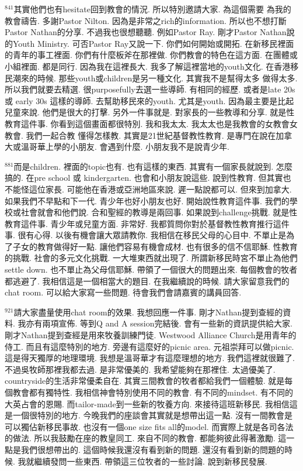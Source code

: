 \documentclass{book}
\begin{document}
$^{841}$其實他們也有hesitate回到教會的情況.
所以特別邀請大家.
為這個需要 為我的教會禱告.
多謝Pastor Nilton.
因為是非常之rich的information.
所以也不想打斷Pastor Nathan的分享.
不過我也很想聽聽.
例如Pastor Ray.
剛才Pastor Nathan說的Youth Ministry.
可否Pastor Ray又說一下.
你們如何開始或開拓.
在新移民裡面的青年的事工裡面.
你們有什麼板斧在那裡做.
你們教會的特色在這方面.
在團體或小組裡面.
都是同行.
因為我在這裡長大.
我多了解這裡當地的youth文化.
在香港移民潮來的時候.
那些youth或children是另一種文化.
其實我不是幫得太多 做得太多.
所以我們就要去精選.
很purposefully去選一些導師.
有相同的經歷.
或者是late 20s 或 early 30s 這樣的導師.
去幫助移民來的youth.
尤其是youth.
因為最主要是比起兒童來說.
他們是很大的打擊.
另外一件事就是.
對家長的一些教導和分享.
就是性教育這件事.
你看到這個畫面都很特別.
我和我太太.
我太太也是我教會的女教會女教會.
我們一起合教 懂得怎樣教.
其實是21世紀基督教性教育.
是專門在說在加拿大或溫哥華上學的小朋友.
會遇到什麼.
小朋友我不是說青少年.

$^{881}$而是children.
裡面的topic也有.
也有這樣的東西.
其實有一個家長就說到.
怎麼搞的.
在pre school 或 kindergarten.
也會和小朋友說這些.
說到性教育.
但其實也不能怪這位家長.
可能他在香港或亞洲地區來說.
遲一點說都可以.
但來到加拿大.
如果我們不早點和下一代.
青少年也好小朋友也好.
開始說性教育這件事.
我們的學校或社會就會和他們說.
合和聖經的教導是兩回事.
如果說到challenge挑戰.
就是性教育這件事.
青少年或兒童方面.
非常好.
我都質問你對於基督教性教育推行這件事.
很有心得.
以後有機會讓大眾請教你.
我相信在移民父母的心目中.
不單止是為了子女的教育做得好一點.
讓他們容易有機會成材.
也有很多的信不信耶穌.
性教育的挑戰.
社會的多元文化挑戰.
一大堆東西就出現了.
所謂新移民時宮不單止為他們settle down.
也不單止為父母信耶穌.
帶領了一個很大的問題出來.
每個教會的牧者都逃避了.
我相信這是一個相當大的題目.
在我繼續說的時候.
請大家留意我們的chat room.
可以給大家寫一些問題.
待會我們會請嘉賓的講員回答.

$^{921}$請大家盡量使用chat room的效果.
我想回應一件事.
剛才Nathan提到查經的資料.
我亦有兩項宣佈.
等到Q and A session完結後.
會有一些新的資訊提供給大家.
剛才Nathan提到查經是用來牧養訓練門徒.
Westwood Alliance Church是用青年的侍工.
而且有這麼特別的地方.
旁邊有這麼好的picnic area.
元祖崇拜可以做picnic.
這是得天獨厚的地理環境.
我想是溫哥華才有這麼理想的地方.
我們這裡就很難了.
不過吳牧師那裡我都去過.
是非常優美的.
我希望能夠在那裡住.
太過優美了.
countryside的生活非常優柔自在.
其實三間教會的牧者都給我們一個體驗.
就是每個教會都有獨特性.
我相信神會特別使用不同的教會.
有不同的mindset.
有不同的大英占會的恩賜.
而tailor-made到一些新的牧養方向.
來接待這班新移民.
我相信這是一個很特別的地方.
今晚我們的座談會其實就是想帶出這一點.
沒有一間教會是可以獨佔新移民事故.
也沒有一個one size fits all的model.
而實際上就是各司各法的做法.
所以我鼓勵在座的教皇同工.
來自不同的教會.
都能夠彼此得著激勵.
這一點是我們很想帶出的.
這個時候我還沒有看到新的問題.
還沒有看到新的問題的時候.
我就繼續發問一些東西.
帶領這三位牧者的一些討論.
說到新移民發展.
\end{document}
